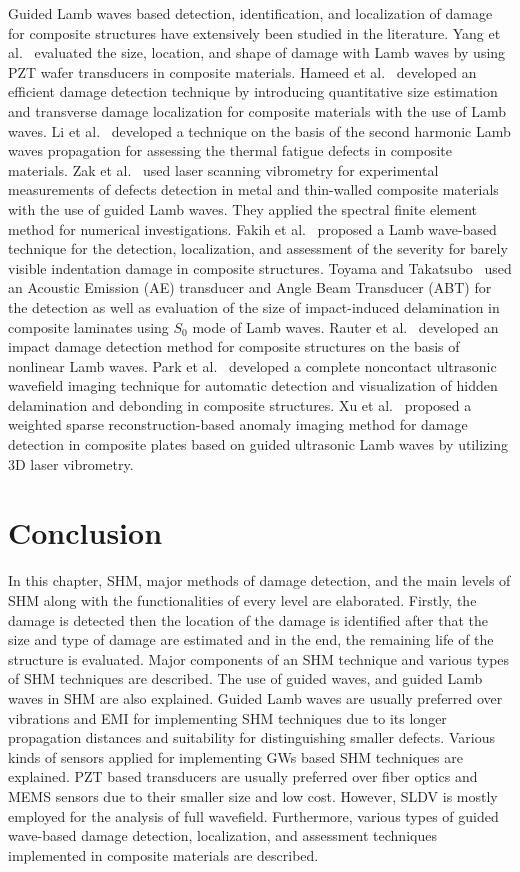 \documentclass[b5paper, 11pt, titlepage]{book}
\begin{document}
Guided Lamb waves based detection, identification, and localization of damage for composite structures have extensively been studied in the literature. Yang et al.~\cite{Yang2019} evaluated the size, location, and shape of damage with Lamb waves by using PZT wafer transducers in composite materials. Hameed et al.~\cite{Hameed2019b} developed an efficient damage detection technique by introducing quantitative size estimation and transverse damage localization for composite materials with the use of Lamb waves. Li et al.~\cite{Li2012} developed a technique on the basis of the second harmonic Lamb waves propagation for assessing the thermal fatigue defects in composite materials. Zak et al.~\cite{Zak2012} used laser scanning vibrometry for experimental measurements of defects detection in metal and thin-walled composite materials with the use of guided Lamb waves. They applied the spectral finite element method for numerical investigations. Fakih et al.~\cite{Fakih2019} proposed a Lamb wave-based technique for the detection, localization, and assessment of the severity for barely visible indentation damage in composite structures. Toyama and Takatsubo~\cite{Toyama2004} used an Acoustic Emission (AE) transducer and Angle Beam Transducer (ABT) for the detection as well as evaluation of the size of impact-induced delamination in composite laminates using $S_0$ mode of Lamb waves. Rauter et al.~\cite{Rauter2015} developed an impact damage detection method for composite structures on the basis of nonlinear Lamb waves. Park et al.~\cite{Park2014} developed a complete noncontact ultrasonic wavefield imaging technique for automatic detection and visualization of hidden delamination and debonding in composite structures. Xu et al.~\cite{Staszewski2009} proposed a weighted sparse reconstruction-based anomaly imaging method for damage detection in composite plates based on guided ultrasonic Lamb waves by utilizing 3D laser vibrometry. 

\section{Conclusion}
In this chapter, SHM, major methods of damage detection, and the main levels of SHM along with the functionalities of every level are elaborated. Firstly, the damage is detected then the location of the damage is identified after that the size and type of damage are estimated and in the end, the remaining life of the structure is evaluated. Major components of an SHM technique and various types of SHM techniques are described. The use of guided waves, and guided Lamb waves in SHM are also explained. Guided Lamb waves are usually preferred over vibrations and EMI for implementing SHM techniques due to its longer propagation distances and suitability for distinguishing smaller defects. Various kinds of sensors applied for implementing GWs based SHM techniques are explained. PZT based transducers are usually preferred over fiber optics and MEMS sensors due to their smaller size and low cost. However, SLDV is mostly employed for the analysis of full wavefield. Furthermore, various types of guided wave-based damage detection, localization, and assessment techniques implemented in composite materials are described.
\end{document}
